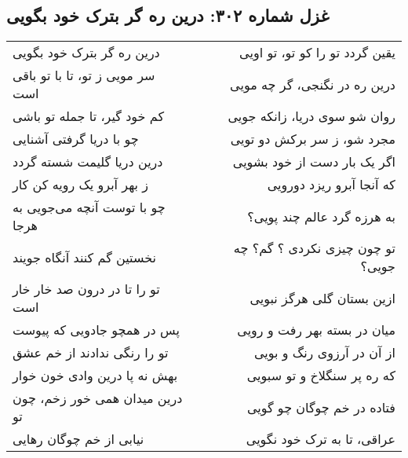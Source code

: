 \begin{center}
\section*{غزل شماره ۳۰۲: درین ره گر بترک خود بگویی}
\label{sec:302}
\begin{longtable}{l p{0.5cm} r}
درین ره گر بترک خود بگویی
&&
یقین گردد تو را کو تو، تو اویی
\\
سر مویی ز تو، تا با تو باقی است
&&
درین ره در نگنجی، گر چه مویی
\\
کم خود گیر، تا جمله تو باشی
&&
روان شو سوی دریا، زانکه جویی
\\
چو با دریا گرفتی آشنایی
&&
مجرد شو، ز سر برکش دو تویی
\\
درین دریا گلیمت شسته گردد
&&
اگر یک بار دست از خود بشویی
\\
ز بهر آبرو یک رویه کن کار
&&
که آنجا آبرو ریزد دورویی
\\
چو با توست آنچه می‌جویی به هرجا
&&
به هرزه گرد عالم چند پویی؟
\\
نخستین گم کنند آنگاه جویند
&&
تو چون چیزی نکردی ؟ گم؟ چه جویی؟
\\
تو را تا در درون صد خار خار است
&&
ازین بستان گلی هرگز نبویی
\\
پس در همچو جادویی که پیوست
&&
میان در بسته بهر رفت و رویی
\\
تو را رنگی ندادند از خم عشق
&&
از آن در آرزوی رنگ و بویی
\\
بهش نه پا درین وادی خون خوار
&&
که ره پر سنگلاخ و تو سبویی
\\
درین میدان همی خور زخم، چون تو
&&
فتاده در خم چوگان چو گویی
\\
نیابی از خم چوگان رهایی
&&
عراقی، تا به ترک خود نگویی
\\
\end{longtable}
\end{center}
